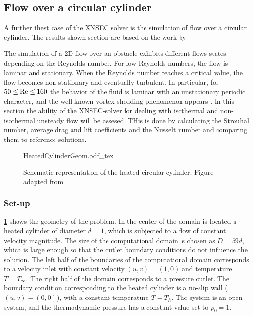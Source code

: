 \subsection{Flow over a circular cylinder}\label{ssec:FlowCircCyl}

A further thest case of the XNSEC solver is the simulation of flow over a circular cylinder. The results shown section are based on the work by \cite{miaoHighOrderSimulationLowMachFlows2022}

The simulation of a 2D flow over an obstacle exhibits different flows states depending on the Reynolds number. For low Reynolds numbers, the flow is laminar and stationary. When the Reynolds number reaches a critical value, the flow becomes non-stationary and eventually turbulent. In particular, for $50 \leq \text{Re} \leq 160$ the behavior of the fluid is laminar with an unstationary periodic character, and the well-known vortex shedding phenomenon appears \citep{sharmaHEATFLUIDFLOW2004}. In this section the ability of the XNSEC-solver for dealing with isothermal and non-isothermal unsteady flow will be assesed. 
THis is done by calculating the Strouhal number, average drag and lift coefficients and the Nusselt number and comparing them to reference solutions.
\begin{figure}[t!]
	\begin{center}
		\def\svgwidth{0.88\textwidth}
		{HeatedCylinderGeom.pdf_tex}
		\caption{Schematic representation of the heated circular cylinder. Figure adapted from \citep{miaoHighOrderSimulationLowMachFlows2022}} 
		\label{fig:CircularCylinderGeom}%
	\end{center}%
\end{figure}%
\subsubsection{Set-up}
\cref{fig:CircularCylinderGeom} shows the geometry of the problem. In the center of the domain is located a heated cylinder of diameter $d = 1$, which is subjected to a flow of constant velocity magnitude. The size of the computational domain is chosen as $D = 59d$, which is large enough so that the outlet boundary conditions do not influence the solution. The left half of the boundaries of the computational domain corresponds to a velocity inlet with constant velocity $(u,v) = (1,0)$ and temperature $T = T_\infty$. The right half of the domain corresponds to a pressure outlet. The boundary condition corresponding to the heated cylinder is a no-slip wall ($(u,v) = (0,0)$), with a constant temperature $T = T_h$. The system is an open system, and the thermodynamic pressure has a constant value set to $p_0 = 1$.

